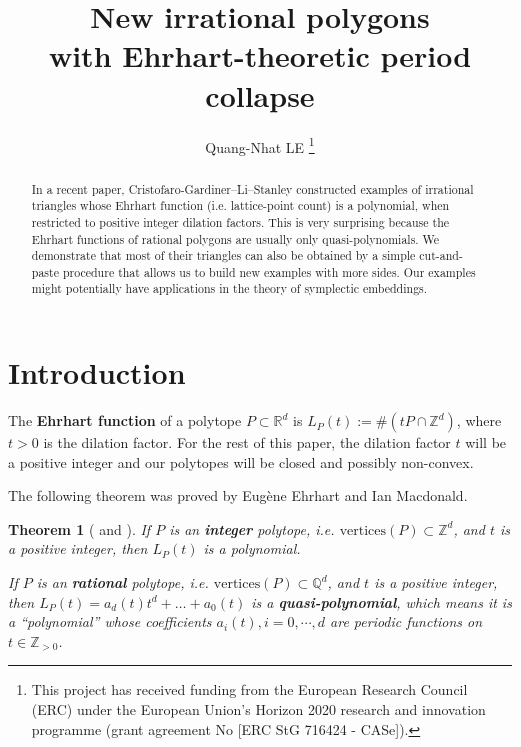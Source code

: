 \documentclass[a4paper]{article}
\newtheorem{thm}{Theorem}
\begin{document}
\title{New irrational polygons \\ with Ehrhart-theoretic period collapse}
\author{Quang-Nhat LE
\thanks{This project has received funding from the European Research Council (ERC) under the European Union's Horizon 2020 research and innovation programme (grant agreement No [ERC StG 716424 - CASe]).}
}

\maketitle

\begin{abstract}
In a recent paper, Cristofaro-Gardiner--Li--Stanley \cite{cristofaro2015new} constructed examples of irrational triangles whose Ehrhart function (i.e. lattice-point count) is a polynomial, when restricted to positive integer dilation factors. This is very surprising because the Ehrhart functions of rational polygons are usually only quasi-polynomials. We demonstrate that most of their triangles can also be obtained by a simple cut-and-paste procedure that allows us to build new examples with more sides. Our examples might potentially have applications in the theory of symplectic embeddings.
\end{abstract}

\section{Introduction}
The \textbf{Ehrhart function} of a polytope $P \subset \mathbb{R}^d$ is $L_P(t) := \#(tP \cap \mathbb{Z}^d)$, where $t > 0$ is the dilation factor. For the rest of this paper, the dilation factor $t$ will be a positive integer and our polytopes will be closed and possibly non-convex. 

The following theorem was proved by Eug\`ene Ehrhart and Ian Macdonald.
\begin{thm}[\cite{ehrhart1967probleme} and \cite{macdonald1971polynomials}] If $P$ is an \textbf{integer} polytope, i.e. $\text{vertices}(P) \subset \mathbb{Z}^d$, and $t$ is a positive integer, then $L_P(t)$ is a polynomial.

If $P$ is an \textbf{rational} polytope, i.e. $\text{vertices}(P) \subset \mathbb{Q}^d$, and $t$ is a positive integer, then $L_P(t) = a_d(t)t^d + \dots + a_0(t)$ is a \textbf{quasi-polynomial}, which means it is a ``polynomial'' whose coefficients $a_i(t), i = 0, \cdots, d$ are periodic functions on $t \in \mathbb{Z}_{>0}$. 
\end{thm}
\end{document}
